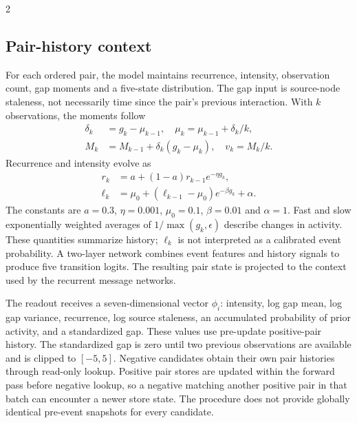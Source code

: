 \documentclass[a4paper,10pt,fleqn]{article}
\begin{document}
\begin{multicols}{2}
\subsection{Pair-history context}
For each ordered pair, the model maintains recurrence, intensity, observation count, gap moments and a five-state distribution. The gap input is source-node staleness, not necessarily time since the pair's previous interaction. With $k$ observations, the moments follow
\begin{align}
\delta_k&=g_k-\mu_{k-1},\quad \mu_k=\mu_{k-1}+\delta_k/k,\nonumber\\
M_k&=M_{k-1}+\delta_k(g_k-\mu_k),\quad v_k=M_k/k.
\label{eq:welford}
\end{align}
Recurrence and intensity evolve as
\begin{align}
r_k&=a+(1-a)r_{k-1}e^{-\eta g_k},\label{eq:recurrence}\\
\ell_k&=\mu_0+(\ell_{k-1}-\mu_0)e^{-\beta g_k}+\alpha.
\label{eq:hawkes}
\end{align}
The constants are $a=0.3$, $\eta=0.001$, $\mu_0=0.1$, $\beta=0.01$ and $\alpha=1$. Fast and slow exponentially weighted averages of $1/\max(g_k,\epsilon)$ describe changes in activity. These quantities summarize history; $\ell_k$ is not interpreted as a calibrated event probability. A two-layer network combines event features and history signals to produce five transition logits. The resulting pair state is projected to the context used by the recurrent message networks.

The readout receives a seven-dimensional vector $\phi_i$: intensity, log gap mean, log gap variance, recurrence, log source staleness, an accumulated probability of prior activity, and a standardized gap. These values use pre-update positive-pair history. The standardized gap is zero until two previous observations are available and is clipped to $[-5,5]$. Negative candidates obtain their own pair histories through read-only lookup. Positive pair stores are updated within the forward pass before negative lookup, so a negative matching another positive pair in that batch can encounter a newer store state. The procedure does not provide globally identical pre-event snapshots for every candidate.


\end{multicols}
\end{document}
